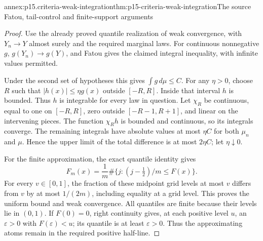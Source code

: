 \begin{annexitem}{annex:p15.criteria-weak-integration}{thm:p15-criteria-weak-integration}{The source Fatou, tail-control and finite-support arguments}
\begin{proof}
Use the already proved quantile realization of weak
convergence, with \(Y_n\to Y\) almost surely and the required
marginal laws. For continuous nonnegative \(g\),
\(g(Y_n)\to g(Y)\), and Fatou gives the claimed integral
inequality, with infinite values permitted.

Under the second set of hypotheses this gives
\(\int g\,d\mu\leq C\).
For any \(\eta>0\), choose \(R\) such that
\(|h(x)|\leq\eta g(x)\) outside \([-R,R]\).
Inside that interval \(h\) is bounded.
Thus \(h\) is integrable for every law in question.
Let \(\chi_R\) be continuous, equal to one on \([-R,R]\),
zero outside \([-R-1,R+1]\), and linear on the intervening
pieces. The function \(\chi_Rh\) is bounded and continuous,
so its integrals converge. The remaining integrals have
absolute values at most \(\eta C\) for both \(\mu_n\)
and \(\mu\). Hence the upper limit of the total difference
is at most \(2\eta C\); let \(\eta\downarrow0\).

For the finite approximation, the exact quantile identity
gives
\[
 F_m(x)=\frac1m\#\{j:(j-\tfrac12)/m\leq F(x)\}.
\]
For every \(v\in[0,1]\), the fraction of these midpoint
grid levels at most \(v\) differs from \(v\) by at most
\(1/(2m)\), including equality at a grid level.
This proves the uniform bound and weak convergence.
All quantiles are finite because their levels lie in
\((0,1)\). If \(F(0)=0\), right continuity gives, at
each positive level \(u\), an \(\varepsilon>0\) with
\(F(\varepsilon)<u\); its quantile is at least
\(\varepsilon>0\). Thus the approximating atoms remain
in the required positive half-line.
\end{proof}
\end{annexitem}

